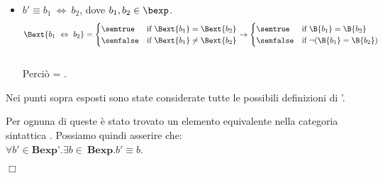 {\begin{enumerate}[label=(\alph*)]
\begin{itemize}
    \item $ b' \equiv b_1 \ \Leftrightarrow \ b_2$, dove $b_1, b_2 \in \bexp$.
    \\
    \begin{align*}
      \Bext{b_1 \ \Leftrightarrow \ b_2} = 
      \begin{cases} 
      \semtrue & 
      \mbox{if} \ \Bext{b_1} = \Bext{b_2}\\
      \semfalse & 
      \mbox{if} \ \Bext{b_1} \neq \Bext{b_2}\\
      \end{cases} 
      \rightarrow
      \begin{cases} 
      \semtrue & 
      \mbox{if} \ \B{b_1} = \B{b_2}\\
      \semfalse & 
      \mbox{if} \ \lnot (\B{b_1} = \B{b_2})\\
      \end{cases} 
    \end{align*} \\
      Perciò  = . \\

  \end{itemize}
\end{enumerate}

Nei punti sopra esposti sono state considerate tutte le possibili definizioni
di \bexp'.

Per ognuna di queste è stato trovato un elemento equivalente nella
categoria sintattica \bexp. Possiamo quindi asserire che: \\

$\forall b' \in \textbf{Bexp'}.\exists b \in \ \textbf{Bexp}.b' \equiv b$.

\begin{flushright}
$\Box$
\end{flushright}
}